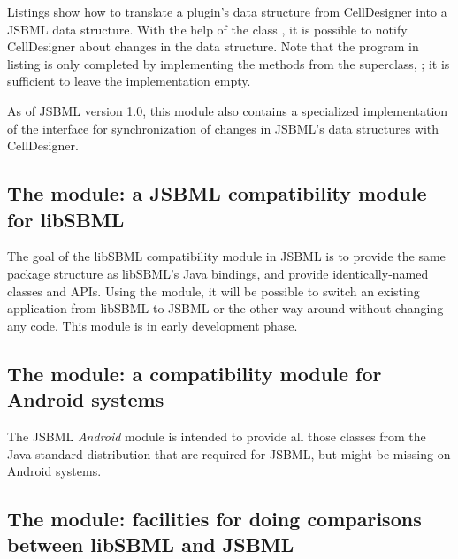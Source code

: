 
Listings  show how to translate a
plugin's data structure from CellDesigner into a JSBML data structure. With
the help of the class \PluginSBMLWriter, it is possible to notify
CellDesigner about changes in the data structure. Note that the program in
listing  is only completed by implementing the methods from the
superclass, ; it is sufficient to leave the
implementation empty.

As of JSBML version 1.0, this module also contains a specialized
implementation of the \TreeNodeChangeListener{} interface for
synchronization of changes in JSBML's data structures with CellDesigner.


\clearpage

\subsection{The  module: a JSBML compatibility
  module for libSBML}

The goal of the libSBML compatibility module in JSBML is to provide the
same package structure as libSBML's Java bindings, and provide
identically-named classes and APIs. Using the module, it will be possible
to switch an existing application from libSBML to JSBML or the other way
around without changing any code.  %
This module is in early development phase.

\subsection{The  module: a compatibility module for
  Android systems}

The JSBML \emph{Android} module is intended to provide all those classes
from the Java standard distribution that are required for JSBML, but might
be missing on Android systems.

\subsection{The  module: facilities for doing comparisons between libSBML and JSBML}

